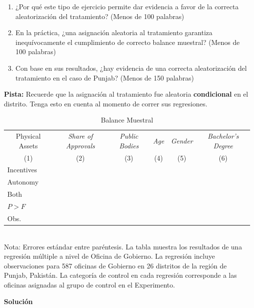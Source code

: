 \documentclass[a4paper, answers, addpoints, 11pt]{exam}
\newenvironment{solucion}{%
  \begin{mdframed}[
    backgroundcolor=blue!5,    %
    linecolor=blue!50,          %
    linewidth=2pt,              %
    leftmargin=10pt,            %
    rightmargin=10pt,           %
    topline=true,              %
    bottomline=true,            %
    roundcorner=10pt,           %
    innerleftmargin=10pt,       %
    innerrightmargin=10pt,      %
    innerbottommargin=10pt,     %
    innertopmargin=10pt         %
  ]%
  \begin{tcolorbox}[colframe=blue!50!black, colback=blue!50, coltitle=white, sharp corners=all, boxrule=1mm, width=\textwidth, halign=left, valign=center, top=0mm, bottom=0mm, left=0mm, right=0mm] \textbf{Solución} \end{tcolorbox} }{\end{mdframed}}
\begin{document}
\begin{enumerate}
    \begin{enumerate}
        \item ¿Por qué este tipo de ejercicio permite dar evidencia a favor de la correcta aleatorización del tratamiento? (Menos de 100 palabras)
        \item En la práctica, ¿una asignación aleatoria al tratamiento garantiza inequívocamente el cumplimiento de correcto balance muestral? (Menos de 100 palabras)
        \item Con base en sus resultados, ¿hay evidencia de una correcta aleatorización del tratamiento en el caso de Punjab? (Menos de 150 palabras)
         \end{enumerate}
        \bigbreak
        \textbf{Pista:} Recuerde que la asignación al tratamiento fue aleatoria \textbf{condicional} en el distrito. Tenga esto en cuenta al momento de correr sus regresiones. 
        \begin{table}[H]
		\centering
			\caption{Balance Muestral}
			\label{tab2:balancetemplacte}
			\begin{tabular}{lccccc}
				\toprule
				\multicolumn{1}{c}{Physical Assets} & \multicolumn{1}{c}{\textit{Share of Approvals}} & \textit{Public Bodies} & \textit{Age} & \textit{Gender} & \textit{Bachelor's Degree}  \\
				\multicolumn{1}{c}{(1)} & 	\multicolumn{1}{c}{(2)} & (3) & (4) & (5) & (6) \\ \toprule
				  \addlinespace 
				Incentives &&&& \\
                Autonomy &&&& \\
                Both &&&& \\ \midrule
                $P>F$ &&&& \\
                Obs.&&&& \\ \bottomrule
            \end{tabular}
             {\footnotesize{\\Nota: Errores estándar entre paréntesis. La tabla muestra los resultados de una regresión múltiple a nivel de Oficina de Gobierno. La regresión incluye observaciones para 587 oficinas de Gobierno en 26 distritos de la región de Punjab, Pakistán.  La categoría de control en cada regresión corresponde a las oficinas asignadas al grupo de control en el Experimento.}}
	\end{table}
     \begin{solucion}
  

\end{solucion}
\end{enumerate}
\end{document}
